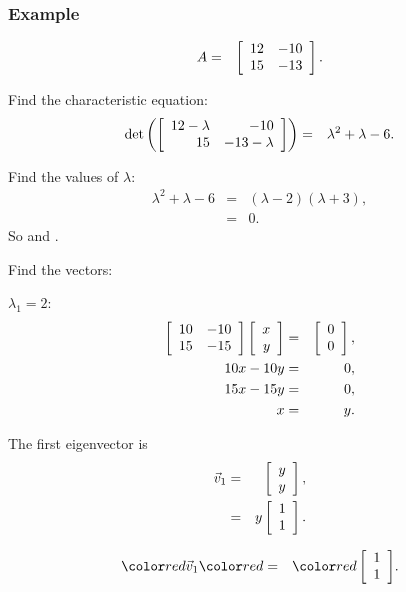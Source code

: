 \begin{frame}
  \frametitle{Example}

  \begin{eqnarray*}
    A & = & \left[ \begin{array}{rr} 12 & -10 \\ 15 & -13 \end{array} \right].
  \end{eqnarray*}

  Find the characteristic equation:
  \begin{eqnarray*}
    \det\left(\left[ \begin{array}{rr} 12-\lambda & -10 \\ 15 & -13-\lambda \end{array} \right]\right) & = & \lambda^2+\lambda-6.
  \end{eqnarray*}

  Find the values of $\lambda$:
  \begin{eqnarray*}
    \lambda^2+\lambda-6 & = & (\lambda-2)(\lambda+3), \\
    & = & 0.
  \end{eqnarray*}
  So  and .

\end{frame}


\begin{frame}
  Find the vectors:

  $\lambda_1 = 2$:
  \begin{eqnarray*}
    \left[ \begin{array}{rr} 10 & -10 \\ 15 & -15 \end{array} \right] \left[ \begin{array}{r} x \\ y \end{array} \right] & = & \left[ \begin{array}{r} 0 \\ 0 \end{array} \right], \\
    10x - 10y & = & 0, \\
    15x - 15y & = & 0, \\
    x & = & y.
  \end{eqnarray*}

  The first eigenvector is 
  \begin{eqnarray*}
    \vec{v}_1 & = & \left[ \begin{array}{r} y \\ y \end{array} \right], \\
    & = & y \left[ \begin{array}{r} 1 \\ 1 \end{array} \right].
  \end{eqnarray*}

  \begin{eqnarray*}
    \redText{\vec{v}_1} & \redText{=} & \redText{\vecTwo{1}{1}}.
  \end{eqnarray*}

\end{frame}

